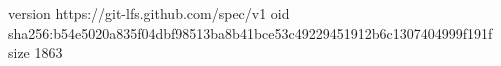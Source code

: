 version https://git-lfs.github.com/spec/v1
oid sha256:b54e5020a835f04dbf98513ba8b41bce53c49229451912b6c1307404999f191f
size 1863
